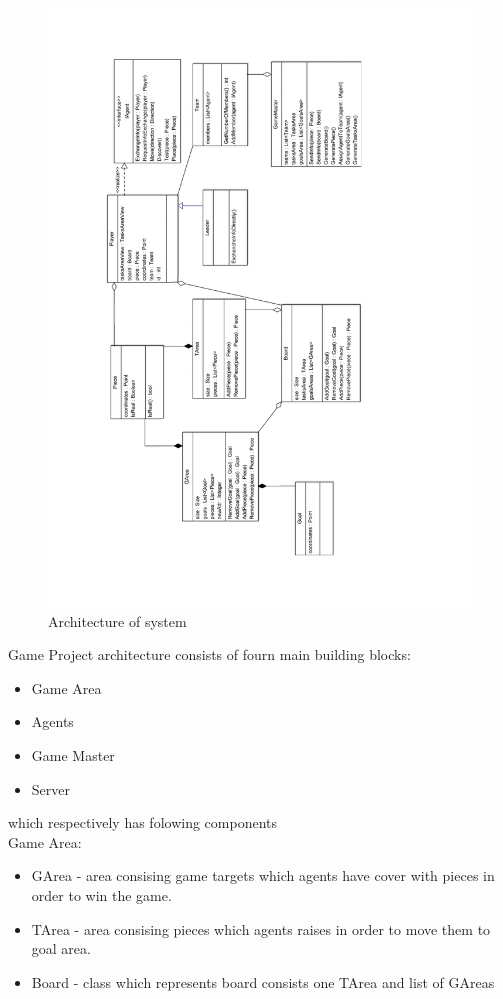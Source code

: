 \documentclass[11pt,a4paper]{article}
\begin{document}
\begin{figure}
\begin{center}
\includegraphics[scale=0.7]{architecture}
\caption{Architecture of system}
\end{center}
\end{figure}

Game Project architecture consists of fourn main building blocks:
\begin{itemize}
\item Game Area
\item Agents
\item Game Master
\item Server
\end{itemize}

which respectively has folowing components\\
\cdot Game Area:
\begin{itemize}
\item GArea - area consising game targets which agents have cover with pieces in order to win the game.
\item TArea - area consising pieces which agents raises in order to move them to goal area.
\item Board - class which represents board consists one TArea and list of GAreas
\end{itemize}
\end{document}
